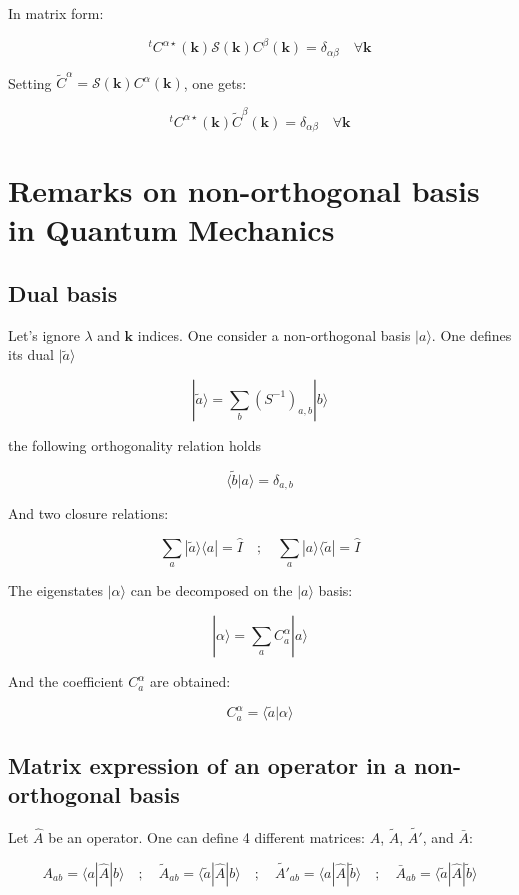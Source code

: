 \documentclass{article}
\newcommand{\bra}[1]{\langle #1|}
\newcommand{\ket}[1]{|#1\rangle}
\newcommand{\braket}[2]{\langle #1|#2\rangle}
\newcommand{\op}[1]{\hat{#1}}
\begin{document}
\noindent
In matrix form:

\[ ^tC^{\alpha \star}(\mathbf{k})\mathcal{S}(\mathbf{k})C^{\beta}(\mathbf{k})=
\delta_{\alpha \beta} \quad \forall \mathbf{k} \]

\noindent
Setting
$\widetilde{C}^{\alpha}=\mathcal{S}(\mathbf{k})C^{\alpha}(\mathbf{k})$, one gets:

\[ ^tC^{\alpha \star}(\mathbf{k})\widetilde{C}^{\beta}(\mathbf{k})=\delta_{\alpha \beta}
\quad \forall \mathbf{k} \]



\section{Remarks on non-orthogonal basis in Quantum Mechanics}

\subsection{Dual basis}
\noindent
Let's ignore $\lambda$ and $\mathbf{k}$ indices. One consider
a non-orthogonal basis $\ket{a}$. One defines its dual $\ket{\tilde{a}}$

    
\[\displaystyle \ket{\tilde{a}}=\sum_{b}  (S^{-1})_{a,b} \ket{b }\]

\noindent
the following  orthogonality relation holds

\[\braket{\tilde{b}}{ a }= \delta_{a,b} \]


\noindent
And two closure relations: 

\[ \displaystyle \sum_{a} \ket{\tilde{a}} \bra{a}=\op{I} \quad ; \quad
                 \sum_{a } \ket{a} \bra{\tilde{a}} =\op{I}
 \]

\noindent
The eigenstates $\ket{\alpha}$ can be decomposed on the $\ket{a}$ basis:

\[ \ket{\alpha}=\sum_a C_a^{\alpha} \ket{a} \]

\noindent
And the coefficient $C_a^{\alpha}$ are obtained:

\[ C_a^{\alpha}= \braket{ \tilde{a}}{\alpha}\]


\subsection{Matrix expression of an operator in a non-orthogonal basis}

Let $\op{A}$ be an operator.
One can define 4 different matrices: $A$, $\tilde{A}$, $\tilde{A'}$, and $\bar{A}$:

\[  A_{ab}=\bra{a } \op{A} \ket{b} \quad ; \quad 
   \tilde{A}_{ab}=\bra{\tilde{a}} \op{A} \ket{b} \quad ; \quad
   \tilde{A'}_{ab}=\bra{a} \op{A} \ket{\tilde{b}} \quad ; \quad   
   \bar{A}_{ab}=\bra{\tilde{a}} \op{A} \ket{\tilde{b}} \]
\end{document}

